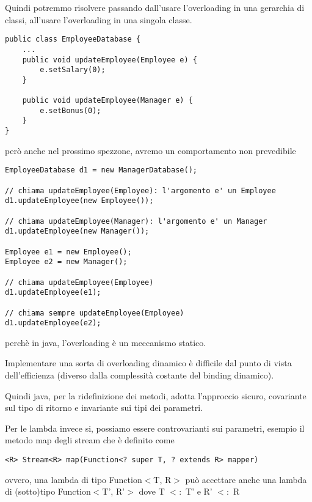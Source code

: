 Quindi potremmo risolvere passando dall'usare l'overloading in una gerarchia di classi, all'usare l'overloading in una singola classe.

\begin{lstlisting}
public class EmployeeDatabase {
    ...
    public void updateEmployee(Employee e) {
        e.setSalary(0);
    }

    public void updateEmployee(Manager e) {
        e.setBonus(0);
    }
}
\end{lstlisting}

però anche nel prossimo spezzone, avremo un comportamento non prevedibile
\begin{lstlisting}
EmployeeDatabase d1 = new ManagerDatabase();

// chiama updateEmployee(Employee): l'argomento e' un Employee
d1.updateEmployee(new Employee());

// chiama updateEmployee(Manager): l'argomento e' un Manager
d1.updateEmployee(new Manager());

Employee e1 = new Employee();
Employee e2 = new Manager();

// chiama updateEmployee(Employee)
d1.updateEmployee(e1);

// chiama sempre updateEmployee(Employee)
d1.updateEmployee(e2);
\end{lstlisting}

perchè in java, l'overloading è un meccanismo statico.

Implementare una sorta di overloading dinamico è difficile dal punto di vista dell'efficienza (diverso dalla complessità costante del binding dinamico).

Quindi java, per la ridefinizione dei metodi, adotta l’approccio sicuro, covariante sul tipo di ritorno e invariante sui tipi dei parametri.

Per le lambda invece si, possiamo essere controvarianti sui parametri, esempio il metodo map degli stream che è definito come 
\begin{lstlisting}
<R> Stream<R> map(Function<? super T, ? extends R> mapper)    
\end{lstlisting}

ovvero, una lambda di tipo Function$<$T, R$>$ può accettare anche una lambda di (sotto)tipo Function$<$T’, R’$>$ dove T $<:$ T’ e R’ $<:$ R